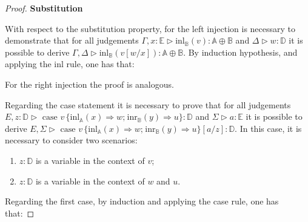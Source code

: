 \documentclass[10pt,a4paper]{amsart}
\theoremstyle{definition}
\theoremstyle{definition}
\theoremstyle{definition}
\theoremstyle{definition}
\theoremstyle{definition}
\theoremstyle{definition}
\begin{document}
\begin{proof}
\textbf{Substitution}

With respect to the substitution property, for the left injection is necessary to demonstrate that for all judgements $\Gamma, x:\mathbb{E} \triangleright \text{inl}_{\mathbb{B}}(v):  \mathbb{A} \oplus \mathbb{B}$ and $\Delta \triangleright w: \mathbb{D}$ it is possible to derive $\Gamma, \Delta \triangleright \text{inl}_{\mathbb{B}}(v[w/x]):  \mathbb{A} \oplus \mathbb{B}$. By induction hypothesis,  and applying the inl rule, one has that:

\begin{figure}[H]
  \centering
  \begin{prooftree}
  \end{prooftree}
  \end{figure}


  For the right injection the proof is analogous.
  
  Regarding the case statement it is necessary to prove that for all judgements $E, z:\mathbb{D} \triangleright  \text{ case } v \hspace{2pt} \{\text{inl}_{\mathbb{A}}  (x) \Rightarrow w ; \hspace{1pt} \text{inr}_{\mathbb{B}}  (y) \Rightarrow u\}: \mathbb{D}$ and $\Sigma\triangleright a: \mathbb{E}$ it is possible to derive $ E, \Sigma  \triangleright \text{ case } v \hspace{2pt} \{\text{inl}_{\mathbb{A}}  (x) \Rightarrow w ; \hspace{1pt} \text{inr}_{\mathbb{B}}  (y) \Rightarrow u\}[a/z]: \mathbb{D}$. In this case, it is necessary to consider two scenarios:
  \begin{enumerate}
    \item $z:\mathbb{D}$ is a variable in the context of $v$;
    \item $z:\mathbb{D}$ is a variable in the context of $w$ and $u$.
  \end{enumerate}
  
  Regarding the first case, by induction and applying the case rule, one has that:



\end{proof}
\end{document}
